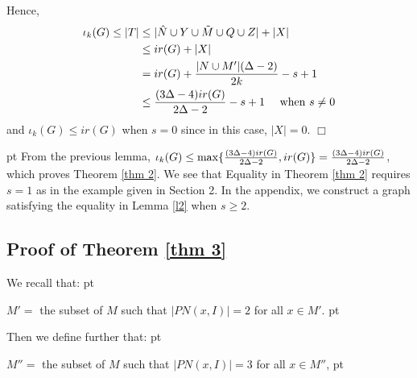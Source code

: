 \documentclass[11pt]{article}
\newcommand{\qed}{$\Box$}
\newcommand{\2}{ \vspace{0.2cm} }
\newcommand{\1}{ \vspace{0.1cm} }
\begin{document}
\noindent Hence,
\begin{align}
\iota_{k}(G) \leq |T| &\leq |\hat{N} \cup Y \cup \tilde{M} \cup Q \cup Z| + |X|\notag\\
                      &\leq ir(G) + |X|\notag\\
                      &=    ir(G) + \frac{|N \cup M'|(\Delta - 2)}{2k} - s + 1\notag\\
                      &\leq \frac{(3\Delta - 4)ir(G)}{2\Delta - 2} - s + 1\notag ~~~~ {\rm when} ~s\neq 0
\end{align}
and $\iota_k(G)\le ir(G)$ when $s=0$ since in this case, $|X|=0$.
\qed

 pt
From the previous lemma, $\iota _k(G)\le {\rm max} \{\frac{(3\Delta - 4)ir(G)}{2\Delta - 2}, ir(G)\}=\frac{(3\Delta - 4)ir(G)}{2\Delta - 2}$, which proves Theorem \ref{thm 2}. We see that Equality in Theorem \ref{thm 2} requires $s = 1$ as in the example given in Section 2.  In the appendix, we construct a graph satisfying the equality in Lemma \ref{l2} when $s \geq 2$.



































\subsection{Proof of Theorem \ref{thm 3}}
We recall that:
 pt

\indent $M' =$ the subset of $M$ such that $|PN(x, I)| = 2$ for all $x \in M'$.
 pt

\noindent Then we define further that:
 pt

\indent $M'' =$ the subset of $M$ such that $|PN(x, I)| = 3$ for all $x \in M''$,
 pt
\end{document}

